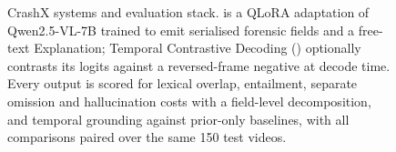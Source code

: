 \begin{figure}[!t]
\caption{CrashX systems and evaluation stack. \crashlogic{} is a QLoRA adaptation of Qwen2.5-VL-7B trained to emit serialised forensic fields and a free-text Explanation; Temporal Contrastive Decoding (\tcd) optionally contrasts its logits against a reversed-frame negative at decode time. Every output is scored for lexical overlap, entailment, separate omission and hallucination costs with a field-level decomposition, and temporal grounding against prior-only baselines, with all comparisons paired over the same 150 test videos.}
\label{fig:pipeline}
\end{figure}
